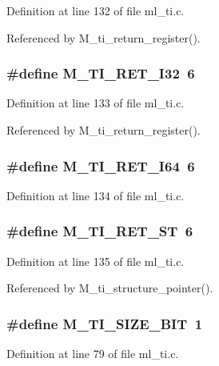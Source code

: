 Definition at line 132 of file ml\_\-ti.c.

Referenced by M\_\-ti\_\-return\_\-register().
\subsubsection{\setlength{\rightskip}{0pt plus 5cm}\#define M\_\-TI\_\-RET\_\-I32~6}\label{ml__ti_8c_96b8223ffe9d896d33501bb14ef4328e}




Definition at line 133 of file ml\_\-ti.c.

Referenced by M\_\-ti\_\-return\_\-register().
\subsubsection{\setlength{\rightskip}{0pt plus 5cm}\#define M\_\-TI\_\-RET\_\-I64~6}\label{ml__ti_8c_1ef8f4b94f2d0a762f0c4739b8e805c4}




Definition at line 134 of file ml\_\-ti.c.
\subsubsection{\setlength{\rightskip}{0pt plus 5cm}\#define M\_\-TI\_\-RET\_\-ST~6}\label{ml__ti_8c_c937db4e7b80a57309ac683cf15fff66}




Definition at line 135 of file ml\_\-ti.c.

Referenced by M\_\-ti\_\-structure\_\-pointer().
\subsubsection{\setlength{\rightskip}{0pt plus 5cm}\#define M\_\-TI\_\-SIZE\_\-BIT~1}\label{ml__ti_8c_4aa2563121f221fae307c4f0c907512a}




Definition at line 79 of file ml\_\-ti.c.
